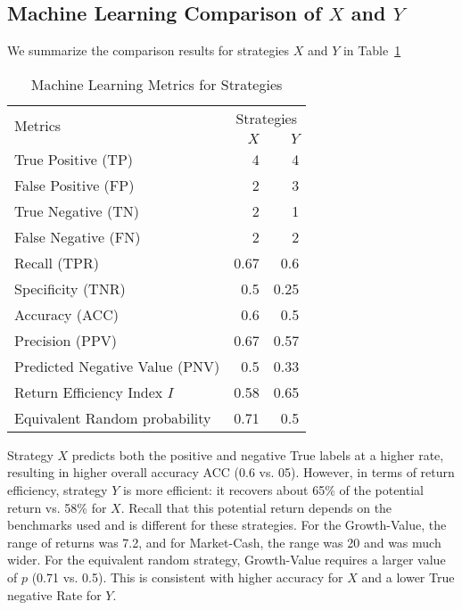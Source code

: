 \documentclass{article}
\begin{document}
\subsection{Machine Learning Comparison of $X$ and $Y$} 


We summarize the comparison results for strategies $X$ and $Y$ in Table~\ref{tab_ml_comparison_example}

\begin{table}[!h]
    \centering
    \caption{Machine Learning Metrics for Strategies}
    \vspace{0.1in}
    \begin{tabular}{ l |  rr } \hline
     \multirow{2}{*}{Metrics} & 
  \multicolumn{2}{c}{\quad Strategies\quad} \\
  & $X$ &  $Y$ \\ \hline
True Positive (TP)  &   4   & 4 \\
False Positive (FP) &   2   &   3\\ 
True Negative (TN)  &   2   &   1\\ 
False Negative (FN) &   2   &   2 \\
Recall (TPR) & 0.67 & 0.6 \\
Specificity (TNR) & 0.5 & 0.25 \\
Accuracy (ACC)           &   0.6   &   0.5\\ 
Precision (PPV) &  0.67 & 0.57\\
Predicted Negative Value (PNV) &  0.5  & 0.33\\
Return Efficiency Index $I$    &   0.58   &   0.65\\
Equivalent Random  probability &   0.71   & 0.5\\
    \hline
      \hline
\end{tabular}
\label{tab_ml_comparison_example}
\end{table}





Strategy $X$ predicts both the positive and negative True labels at a higher rate, resulting in higher overall accuracy ACC (0.6 vs. 05). However, in terms of return efficiency, strategy $Y$ is more efficient: it recovers about 65\% of the potential return vs.
58\% for $X$. Recall that this potential return depends on the benchmarks used and is different for these strategies. For the Growth-Value, the range of returns was 7.2, and for Market-Cash, the range was 20 and was much wider.
For the equivalent random strategy, Growth-Value requires a larger value of $p$ (0.71 vs. 0.5). This is consistent with higher accuracy for $X$ and a lower True negative Rate for $Y$.
\end{document}

